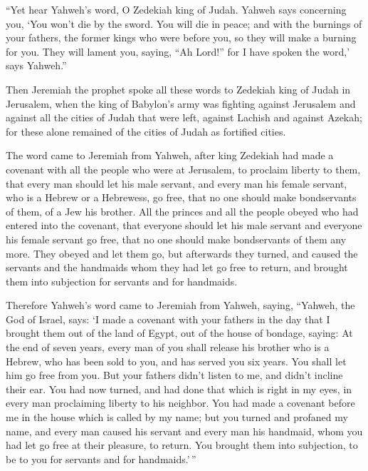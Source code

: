  ``Yet hear Yahweh's word, O Zedekiah king of Judah. Yahweh
says concerning you, `You won't die by the sword.  You will
die in peace; and with the burnings of your fathers, the former kings
who were before you, so they will make a burning for you. They will
lament you, saying, ``Ah Lord!'' for I have spoken the word,' says
Yahweh.''

 Then Jeremiah the prophet spoke all these words to Zedekiah
king of Judah in Jerusalem,  when the king of Babylon's army
was fighting against Jerusalem and against all the cities of Judah that
were left, against Lachish and against Azekah; for these alone remained
of the cities of Judah as fortified cities.

 The word came to Jeremiah from Yahweh, after king Zedekiah
had made a covenant with all the people who were at Jerusalem, to
proclaim liberty to them,  that every man should let his
male servant, and every man his female servant, who is a Hebrew or a
Hebrewess, go free, that no one should make bondservants of them, of a
Jew his brother.  All the princes and all the people obeyed
who had entered into the covenant, that everyone should let his male
servant and everyone his female servant go free, that no one should make
bondservants of them any more. They obeyed and let them go,
 but afterwards they turned, and caused the servants and
the handmaids whom they had let go free to return, and brought them into
subjection for servants and for handmaids.

 Therefore Yahweh's word came to Jeremiah from Yahweh,
saying,  ``Yahweh, the God of Israel, says: `I made a
covenant with your fathers in the day that I brought them out of the
land of Egypt, out of the house of bondage, saying:  At the
end of seven years, every man of you shall release his brother who is a
Hebrew, who has been sold to you, and has served you six years. You
shall let him go free from you. But your fathers didn't listen to me,
and didn't incline their ear.  You had now turned, and had
done that which is right in my eyes, in every man proclaiming liberty to
his neighbor. You had made a covenant before me in the house which is
called by my name;  but you turned and profaned my name,
and every man caused his servant and every man his handmaid, whom you
had let go free at their pleasure, to return. You brought them into
subjection, to be to you for servants and for handmaids.'\,''

